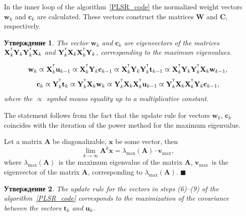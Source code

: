 \documentclass[12pt,twoside]{article}
\newtheorem{statement}{Утверждение}
\newcommand{\bx}{\mathbf{x}}
\newcommand{\bw}{\mathbf{w}}
\newcommand{\bY}{\mathbf{Y}}
\newcommand{\bX}{\mathbf{X}}
\newcommand{\bu}{\mathbf{u}}
\newcommand{\bt}{\mathbf{t}}
\newcommand{\bc}{\mathbf{c}}
\newcommand{\bC}{\mathbf{C}}
\newcommand{\bW}{\mathbf{W}}
\newcommand{\T}{^{\text{\tiny\sffamily\upshape\mdseries T}}}
\begin{document}
In the inner loop of the algorithm~\ref{PLSR_code} the normalized weight vectors $\bw_k$ and $\bc_k$ are calculated. 
These vectors construct the matrices $\bW$ and $\bC$, respectively.

\begin{statement}
	The vector $\bw_k$ and $\bc_k$ are eigenvectors of the matrices $\bX_k^{\T} \bY_k \bY_k^{\T} \bX_k$ and $\bY_k^{\T} \bX_k \bX_k^{\T} \bY_k$, corresponding to the maximum eigenvalues.
	
	\begin{equation*}
	\bw_k \varpropto \bX_k^{\T} \bu_{k-1} \varpropto \bX_k^{\T} \bY_k \bc_{k-1} \varpropto \bX_k^{\T} \bY_k \bY_k^{\T} \bt_{k-1} \varpropto \bX_k^{\T} \bY_k \bY_k^{\T} \bX_k \bw_{k-1},
	\end{equation*}
	\begin{equation*}
	\bc_k \varpropto \bY_k^{\T} \bt_k \varpropto \bY_k^{\T} \bX_k \bw_k \varpropto \bY_k^{\T} \bX_k \bX_k^{\T} \bu_{k-1} \varpropto \bY_k^{\T} \bX_k \bX_k^{\T} \bY_k \bc_{k-1},
	\end{equation*}
	where the $\varpropto$ symbol means equality up to a multiplicative constant.
	\label{st::eig}
\end{statement}

The statement follows from the fact that the update rule for vectors $\bw_k$, $\bc_k$ coincides with the iteration of the power method for the maximum eigenvalue.

Let a matrix $\mathbf{A}$ be diagonalizable, $\bx$ be some vector, then
\[
	\lim_{k \rightarrow \infty} \mathbf{A}^k \bx = \lambda_{\max}(\mathbf{A}) \cdot \mathbf{v}_{\max},
\]
where $ \lambda_{\max} (\mathbf{A})$~is the maximum eigenvalue of the matrix $\mathbf{A}$, $\mathbf{v}_{\max}$~is the eigenvector of the matrix $\mathbf{A}$, corresponding to $ \lambda_{\max} (\mathbf{A})$.
$\blacksquare$

\begin{statement}

The update rule for the vectors in steps (6)--(9) of the algorithm~\ref{PLSR_code} corresponds to the maximization of the covariance between the vectors $\bt_k$ and $\bu_k$.
\end{statement}
\end{document}
